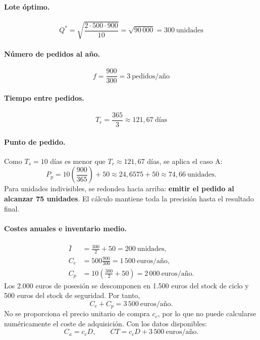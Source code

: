 \documentclass[11pt,a4paper]{article}
\begin{document}
\paragraph{Lote óptimo.}
\[
    Q^{*}=\sqrt{\frac{2\cdot500\cdot900}{10}}
    =\sqrt{90\,000}=300\ \text{unidades}
\]

\paragraph{Número de pedidos al año.}
\[
    f=\frac{900}{300}=3\ \text{pedidos/año}
\]

\paragraph{Tiempo entre pedidos.}
\[
    T_r=\frac{365}{3}\approx121{,}67\ \text{días}
\]

\paragraph{Punto de pedido.}
Como $T_s=10$ días es menor que $T_r\approx121{,}67$ días, se aplica el caso A:
\[
    P_p=10\left(\frac{900}{365}\right)+50
    \approx24{,}6575+50
    \approx74{,}66\ \text{unidades}.
\]
Para unidades indivisibles, se redondea hacia arriba: \textbf{emitir el pedido al alcanzar 75 unidades}. El cálculo mantiene toda la precisión hasta el resultado final.

\paragraph{Costes anuales e inventario medio.}
\begin{align*}
    \bar{I} & = \frac{300}{2}+50=200\ \text{unidades},                    \\
    C_e     & = 500\frac{900}{300}=1\,500\ \text{euros/año},              \\
    C_p     & = 10\left(\frac{300}{2}+50\right)=2\,000\ \text{euros/año}.
\end{align*}
Los 2.000 euros de posesión se descomponen en 1.500 euros del stock de ciclo y 500 euros del stock de seguridad. Por tanto,
\[
    C_e+C_p=3\,500\ \text{euros/año}.
\]
No se proporciona el precio unitario de compra $c_c$, por lo que no puede calcularse numéricamente el coste de adquisición. Con los datos disponibles:
\[
    C_a=c_c D,\qquad CT=c_c D+3\,500\ \text{euros/año}.
\]
\end{document}
